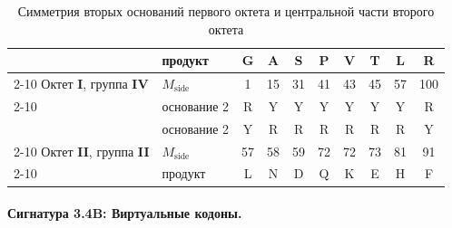 \documentclass[12pt]{article}
\begin{document}
\begin{table}[htbp]
\centering
\caption{Симметрия вторых оснований первого октета и центральной части второго октета}
\label{tab:degeneracy_symm}
\begin{tabular}{|l|l|c|c|c|c|c|c|c|c|}
\hline
 & продукт & G & A & S & P & V & T & L & R \\
\cline{2-10}
Октет \textbf{I}, группа \textbf{IV} & $M_{\text{side}}$ & 1 & 15 & 31 & 41 & 43 & 45 & 57 & 100 \\
\cline{2-10}
 & основание 2 & R & Y & Y & Y & Y & Y & Y & R \\
\hline
\hline
 & основание 2 & Y & R & R & R & R & R & R & Y \\
\cline{2-10}
Октет \textbf{II}, группа \textbf{II} & $M_{\text{side}}$ & 57 & 58 & 59 & 72 & 72 & 73 & 81 & 91 \\
\cline{2-10}
 & продукт & L & N & D & Q & K & E & H & F \\
\hline
\end{tabular}
\end{table}

\paragraph{Сигнатура 3.4B: Виртуальные кодоны.}
\end{document}
